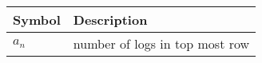 \begin{tabular}{ | m{1.0cm} | m{4cm} | } 
  \hline
 Symbol & Description \\ 
 
 \hline

$a_n$ & number of logs in top most row \\ 
\hline
\end{tabular}\\
\caption{}
\label{Table:1}
